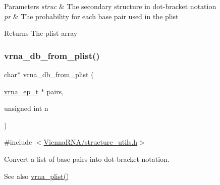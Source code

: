 \begin{DoxyParams}{Parameters}
{\em struc} & The secondary structure in dot-\/bracket notation \\
\hline
{\em pr} & The probability for each base pair used in the plist \\
\hline
\end{DoxyParams}
\begin{DoxyReturn}{Returns}
The plist array 
\end{DoxyReturn}
\mbox{\label{group__struct__utils_ga6a51a36b9245d0bac868c5cd172b9611}} 
\subsubsection{\texorpdfstring{vrna\+\_\+db\+\_\+from\+\_\+plist()}{vrna\_db\_from\_plist()}}
{\footnotesize\ttfamily char$\ast$ vrna\+\_\+db\+\_\+from\+\_\+plist (\begin{DoxyParamCaption}\item[{\hyperlink{group__struct__utils_gab9ac98ab55ded9fb90043b024b915aca}{vrna\+\_\+ep\+\_\+t} $\ast$}]{pairs,  }\item[{unsigned int}]{n }\end{DoxyParamCaption})}



{\ttfamily \#include $<$\hyperlink{structure__utils_8h}{Vienna\+R\+N\+A/structure\+\_\+utils.\+h}$>$}



Convert a list of base pairs into dot-\/bracket notation. 

\begin{DoxySeeAlso}{See also}
\hyperlink{group__struct__utils_gaf002d69024d709744664a8b9ca3dd77d}{vrna\+\_\+plist()} 
\end{DoxySeeAlso}

